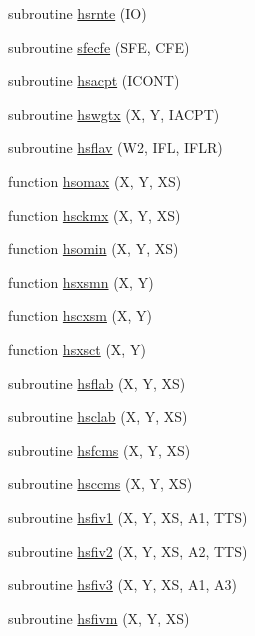 \begin{DoxyCompactItemize}
subroutine \hyperlink{djangoh__h_8f_ad8ebc1d3ae04868815774ec2eda89a8a}{hsrnte} (I\+O)
\item 
subroutine \hyperlink{djangoh__h_8f_a5a653b32b78fa07a92fcdd6c69c0f68d}{sfecfe} (S\+F\+E, C\+F\+E)
\item 
subroutine \hyperlink{djangoh__h_8f_a55436ff7e1bd788550629bf01295b2ca}{hsacpt} (I\+C\+O\+N\+T)
\item 
subroutine \hyperlink{djangoh__h_8f_adec95817ae41b557fdd99a7dd3d415fb}{hswgtx} (X, Y, I\+A\+C\+P\+T)
\item 
subroutine \hyperlink{djangoh__h_8f_a42edf242e7e178839f71084e9df90f74}{hsflav} (W2, I\+F\+L, I\+F\+L\+R)
\item 
function \hyperlink{djangoh__h_8f_a1e2d7b195c4234ca54ca731ba1bd5220}{hsomax} (X, Y, X\+S)
\item 
function \hyperlink{djangoh__h_8f_a1f1037841cdf7240f24c90a08e9e7c32}{hsckmx} (X, Y, X\+S)
\item 
function \hyperlink{djangoh__h_8f_a43a606f9cb0b8dd04c51c7a254d37865}{hsomin} (X, Y, X\+S)
\item 
function \hyperlink{djangoh__h_8f_a01f5ab9fb6612cc6091152aa7ecdb730}{hsxsmn} (X, Y)
\item 
function \hyperlink{djangoh__h_8f_a29a47e021209c36a2cbad8581294922e}{hscxsm} (X, Y)
\item 
function \hyperlink{djangoh__h_8f_a437457ea8295156dc0b2bed60e628c57}{hsxsct} (X, Y)
\item 
subroutine \hyperlink{djangoh__h_8f_a9b4f42a37858a1836e8a5353d37b84a4}{hsflab} (X, Y, X\+S)
\item 
subroutine \hyperlink{djangoh__h_8f_a0f167b5c7522899e009979f4317b7a24}{hsclab} (X, Y, X\+S)
\item 
subroutine \hyperlink{djangoh__h_8f_aca93deed45eb2f3e098f49a98e41a213}{hsfcms} (X, Y, X\+S)
\item 
subroutine \hyperlink{djangoh__h_8f_a2766b8193d774f9b208a7c39e48e2953}{hsccms} (X, Y, X\+S)
\item 
subroutine \hyperlink{djangoh__h_8f_aff94430da824540e2ef916d64fbabe04}{hsfiv1} (X, Y, X\+S, A1, T\+T\+S)
\item 
subroutine \hyperlink{djangoh__h_8f_ab9ff484ceb4fac27e8d018d8c9e1e948}{hsfiv2} (X, Y, X\+S, A2, T\+T\+S)
\item 
subroutine \hyperlink{djangoh__h_8f_ab499d5121f5e51b92ea25dc130ecc954}{hsfiv3} (X, Y, X\+S, A1, A3)
\item 
subroutine \hyperlink{djangoh__h_8f_ac2ab613f5f604e067429f62b9fcd2e1f}{hsfivm} (X, Y, X\+S)

\end{DoxyCompactItemize}
